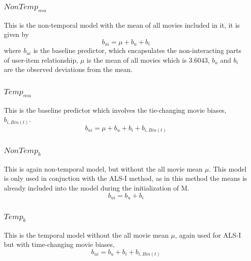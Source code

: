\subsubsection{$NonTemp_{mu}$}
This is the non-temporal model with the mean of all movies included in it, it is
given by \\
\begin{equation}
 b_{ui}=\mu+b_u+b_i
\end{equation}
where $b_{ui}$ is the baseline predictor, which encapsulates the non-interacting
parts of user-item relationship, $\mu$ is the mean of all movies which is
$3.6043$, $b_u$ and $b_i$ are the observed deviations from the mean. 

\subsubsection{$Temp_{mu}$}
This is the baseline predictor which involves the tie-changing movie biases,
$b_{i,Bin(t)}$.
\begin{equation}
 b_{ui}=\mu+b_u+b_i+b_{i,Bin(t)}
\end{equation}

\subsubsection{$NonTemp_b$}
This is again non-temporal model, but without the all movie mean $\mu$. This
model is only used in conjuction with the ALS-I method, as in this method the
means is already included into the model during the initialization of M.
\begin{equation}
 b_{ui}=b_u+b_i
\end{equation}

\subsubsection{$Temp_b$}
This is the temporal model without the all movie mean $\mu$, again used for
ALS-I but with time-changing movie biases,
\begin{equation}
 b_{ui}=b_u+b_i+b_{i,Bin(t)}
\end{equation}

